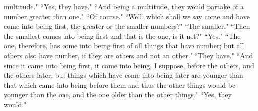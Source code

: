 \documentclass[letterpaper,12pt]{article}
\newcommand{\stephpag}[1]{\marginnote{\small\itshape\fontfamily{ppl}\selectfont #1}}
\begin{document}
multitude." ``Yes, they have." ``And being a multitude, they would partake of a number greater than one." ``Of course." ``Well, which shall we say come and have come into being first, the greater or the smaller numbers?" ``The smaller." ``Then the smallest comes into being first and that is the one, is it not?" \stephpag{b} ``Yes." ``The one, therefore, has come into being first of all things that have number; but all others also have number, if they are others and not an other." ``They have." ``And since it came into being first, it came into being, I suppose, before the others, and the others later; but things which have come into being later are younger than that which came into being before them and thus the other things would be younger than the one, and the one older than the other things." ``Yes, they would."
\end{document}
